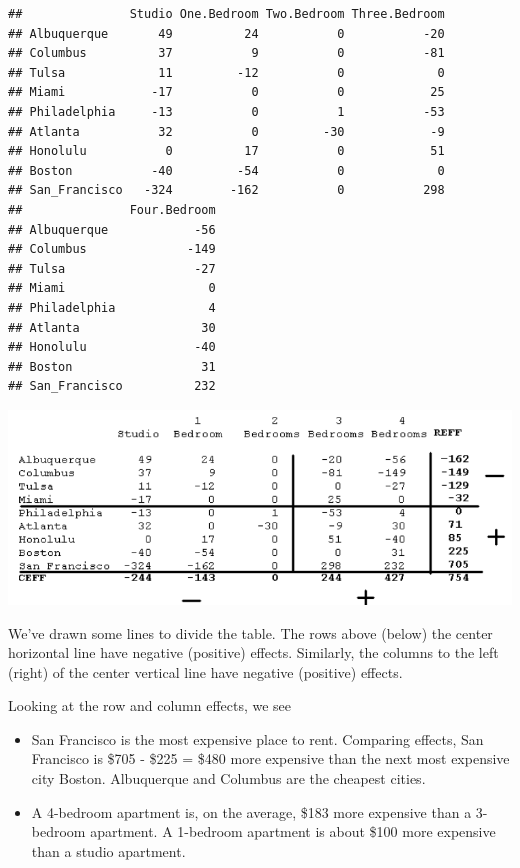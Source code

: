\documentclass[
]{book}
\newenvironment{Shaded}{\begin{snugshade}}{\end{snugshade}}
\newcommand{\NormalTok}[1]{#1}
\newcommand{\SpecialCharTok}[1]{\textcolor[rgb]{0.00,0.00,0.00}{#1}}
\providecommand{\tightlist}{%
  \setlength{\itemsep}{0pt}\setlength{\parskip}{0pt}}
\begin{document}
\begin{Shaded}
\end{Shaded}

\begin{verbatim}
##               Studio One.Bedroom Two.Bedroom Three.Bedroom
## Albuquerque       49          24           0           -20
## Columbus          37           9           0           -81
## Tulsa             11         -12           0             0
## Miami            -17           0           0            25
## Philadelphia     -13           0           1           -53
## Atlanta           32           0         -30            -9
## Honolulu           0          17           0            51
## Boston           -40         -54           0             0
## San_Francisco   -324        -162           0           298
##               Four.Bedroom
## Albuquerque            -56
## Columbus              -149
## Tulsa                  -27
## Miami                    0
## Philadelphia             4
## Atlanta                 30
## Honolulu               -40
## Boston                  31
## San_Francisco          232
\end{verbatim}

\includegraphics[width=0.4\linewidth]{figures/medpolish/newplot1}

We've drawn some lines to divide the table. The rows above (below) the center horizontal line have negative (positive) effects. Similarly, the columns to the left (right) of the center vertical line have negative (positive) effects.

Looking at the row and column effects, we see

\begin{itemize}
\tightlist
\item
  San Francisco is the most expensive place to rent. Comparing effects, San Francisco is \$705 - \$225 = \$480 more expensive than the next most expensive city Boston. Albuquerque and Columbus are the cheapest cities.
\item
  A 4-bedroom apartment is, on the average, \$183 more expensive than a 3-bedroom apartment. A 1-bedroom apartment is about \$100 more expensive than a studio apartment.
\end{itemize}
\end{document}

